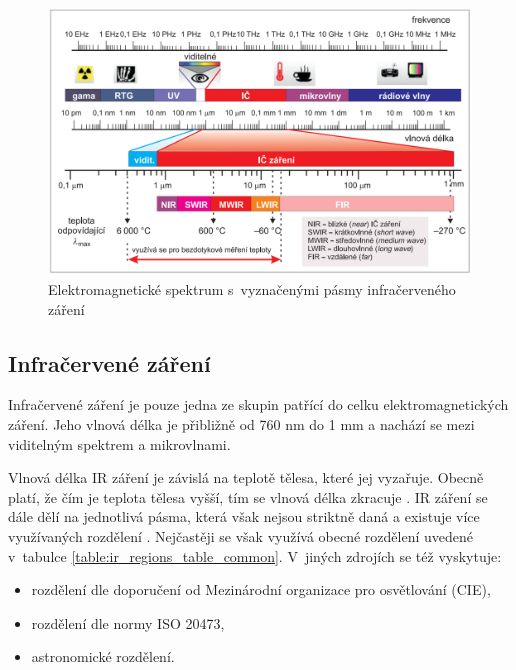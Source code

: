     \begin{figure}[h]
      \centering
      \includegraphics[width=1\textwidth]{images/elektromagneticke_spektrum.png}
      \caption{Elektromagnetické spektrum s~vyznačenými pásmy infračerveného záření 								\cite{kadleckzadkladymereni1}}
    \end{figure}
    
    \subsection{Infračervené záření} \label{sec:ir_radiation}
    Infračervené záření je pouze jedna ze skupin patřící do celku elektromagnetických záření. Jeho vlnová délka je přibližně od 760 nm do 1 mm a nachází se mezi viditelným spektrem a mikrovlnami.  \cite{stupvnankova2009ir} 
        
        Vlnová délka IR záření je závislá na teplotě tělesa, které jej vyzařuje. Obecně platí, že čím je teplota tělesa vyšší, tím se vlnová délka zkracuje \cite{kadleckzadkladymereni1}. IR záření se dále dělí na jednotlivá pásma, která však nejsou striktně daná a existuje více využívaných rozdělení \cite{stupvnankova2009ir}. Nejčastěji se však využívá obecné rozdělení uvedené v~tabulce \ref{table:ir_regions_table_common}. V~jiných zdrojích se též vyskytuje:

    \begin{itemize}[noitemsep]
      \item rozdělení dle doporučení od Mezinárodní organizace pro osvětlování (CIE),
      \item rozdělení dle normy ISO 20473,
      \item astronomické rozdělení.
    \end{itemize}

